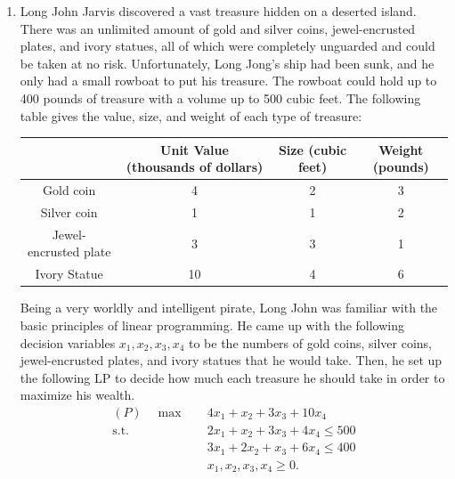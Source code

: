 \documentclass[11pt]{article}
\def \A{\bm{A}}
\def \b{\bm{b}}
\def \c{\bm{c}}
\def \x{\bm{x}}
\def \0{\bm{0}}
\begin{document}
\begin{enumerate}
\begin{enumerate}
        \item For the standard form:
              \begin{align*}
                \min \quad & \c^\top \x \\
                \text{s.t.}\quad & \A\x \le \b, \\
                & \x\ge \0.
              \end{align*}
              
              The dual is:
              \begin{align*}
                \max \quad & \b^\top \bm{y} \\
                \text{s.t.}\quad & \A^\top \bm{y} \ge \c, \\
                & \bm{y} \ge \0.
              \end{align*}
    \end{enumerate}

    \item Long John Jarvis discovered a vast treasure hidden on a deserted island. There was an unlimited amount of gold and silver coins, jewel-encrusted plates, and ivory statues, all of which were completely unguarded and could be taken at no risk. Unfortunately, Long Jong's ship had been sunk, and he only had a small rowboat to put his treasure. The rowboat could hold up to 400 pounds of treasure with a volume up to 500 cubic feet. The following table gives the value, size, and weight of each type of treasure:

\begin{center}
\begin{tabular}{cccc}
\hline
 & Unit Value (thousands of dollars) & Size (cubic feet) & Weight (pounds) \\
\hline
Gold coin & 4 & 2 & 3 \\
Silver coin & 1 & 1  & 2 \\
Jewel-encrusted plate & 3 & 3 & 1 \\
Ivory Statue & 10 & 4 & 6 \\
\hline
\end{tabular}
\end{center}


Being a very worldly and intelligent pirate, Long John was familiar with the basic principles of linear programming. He came up with the following decision variables $x_1, x_2, x_3, x_4$ to be the numbers of gold coins, silver coins, jewel-encrusted plates, and ivory statues that he would take. Then, he set up the following LP to decide how much each treasure he should take in order to maximize his wealth. 
\begin{align*}
(P)\quad\max \quad & 4x_1 + x_2 + 3x_3 + 10x_4 \\
\text{s.t.}\quad & 2x_1 + x_2 + 3x_3 + 4x_4 \leq 500\\
		    & 3x_1 + 2x_2 + x_3 + 6x_4 \leq 400\\
                       & x_1, x_2, x_3, x_4 \geq 0.
\end{align*} 


\end{enumerate}
\end{document}
